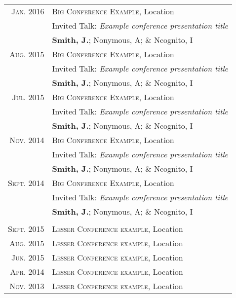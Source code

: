 \documentclass[a4paper,10pt]{article}
\begin{document}
\begin{tabular}{rp{15cm}}
%
\textsc{Jan.} 2016 	& \textsc{Big Conference Example}, Location \\
					& {\footnotesize Invited Talk: \textit{Example conference presentation title}} \\
					& {\footnotesize \textbf{Smith, J.}; Nonymous, A; \& Ncognito, I} \\
%
\textsc{Aug.} 2015 	& \textsc{Big Conference Example}, Location \\
					& {\footnotesize Invited Talk: \textit{Example conference presentation title}} \\
					& {\footnotesize \textbf{Smith, J.}; Nonymous, A; \& Ncognito, I} \\	
%
\textsc{Jul.} 2015 	& \textsc{Big Conference Example}, Location \\
					& {\footnotesize Invited Talk: \textit{Example conference presentation title}} \\
					& {\footnotesize \textbf{Smith, J.}; Nonymous, A; \& Ncognito, I} \\	
%
\textsc{Nov.} 2014 	& \textsc{Big Conference Example}, Location \\
					& {\footnotesize Invited Talk: \textit{Example conference presentation title}} \\
					& {\footnotesize \textbf{Smith, J.}; Nonymous, A; \& Ncognito, I} \\
%
\textsc{Sept.} 2014 & \textsc{Big Conference Example}, Location \\
					& {\footnotesize Invited Talk: \textit{Example conference presentation title}} \\
					& {\footnotesize \textbf{Smith, J.}; Nonymous, A; \& Ncognito, I} \\
					& \\
%
\textsc{Sept.} 2015 & \textsc{Lesser Conference example}, Location \\
\textsc{Aug.} 2015 	& \textsc{Lesser Conference example}, Location \\
\textsc{Jun.} 2015 	& \textsc{Lesser Conference example}, Location \\
\textsc{Apr.} 2014 	& \textsc{Lesser Conference example}, Location \\
\textsc{Nov.} 2013 	& \textsc{Lesser Conference example}, Location \\
%
\end{tabular}

\end{document}
